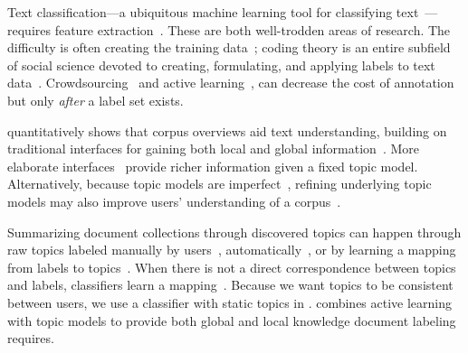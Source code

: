 




















Text classification---a ubiquitous machine learning tool for
classifying text~\cite{zhang-10}---requires feature
extraction~\cite{lewis1992feature}. These are both well-trodden areas
of  research.  The difficulty is often creating the training
data~\cite{hwa2004sample,osborne2004ensemble}; coding theory is an
entire subfield of social science devoted to creating, formulating, and applying labels to text data~\cite{saldana-12,musialek-16}.
Crowdsourcing~\cite{snow-08} and active
learning~\cite{settles2012active}, can decrease the cost of annotation
but only \emph{after} a label set exists.

\nocite{iyyer2014political,anand2011believe,nikolova2011collecting}

\name{} quantitatively shows that corpus overviews aid text
understanding, building on traditional interfaces for gaining both
local and global information~\cite{hearst-96}.  More elaborate
interfaces~\cite{eisenstein-12,chaney-12} provide richer information given a fixed topic model.
Alternatively, because topic models are imperfect~\cite{boyd2014care},
refining underlying topic models may also improve users'
understanding of a corpus~\cite{choo-13,hoque-15}.

Summarizing document collections through discovered topics can happen
through raw topics labeled manually by users~\cite{talley-11}, automatically~\cite{lau-11}, or by learning a mapping
from labels to topics~\cite{ramage-09}.  When there is not a direct
correspondence between topics and labels, classifiers learn a
mapping~\cite{blei-07b,zhu-09,Nguyen:Boyd-Graber:Lund:Seppi:Ringger-2015}.
Because we want topics to be consistent between users, we use a
classifier with static topics in \name{}. \name{} combines active
learning with topic models to provide both global and local knowledge
document labeling requires.






